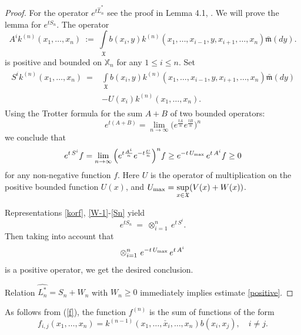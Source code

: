 \documentclass[a4paper,12pt]{article}
\newcommand{\XX}{{\mathbb X}}
\newcommand{\XXX}{{\mathfrak{X}}}
\begin{document}
\begin{proof}
For the operator $e^{t \hat L_n^{\ast}}$ see the proof in Lemma 4.1, \cite{PZ-PPI}. We will prove the lemma for $e^{t S_n}$.
The operator
$$
A^i k^{(n)}(x_1, \ldots, x_n) \ := \ \int\limits_{\XXX} b(x_i, y) k^{(n)} (x_1, \ldots, x_{i-1}, y,
x_{i+1}, \ldots, x_n) \bar{\mathfrak{m}}(dy).
$$
is positive and bounded on $\XX_{n}$ for any $1\leq i\leq n$.
Set
\begin{align}
\begin{aligned}\label{21}
S^i k^{(n)}(x_1, \ldots, x_n) \ = &\int\limits_{\XXX} b(x_i, y) k^{(n)}(x_1, \ldots, x_{i-1}, y, x_{i+1}, \ldots,
x_n) \bar{\mathfrak{m}}( dy)\\
& - U(x_i) k^{(n)}(x_1, \ldots, x_n).
\end{aligned}
\end{align}
Using the Trotter formula for the sum $A+B$ of two bounded operators:
$$
e^{t(A+B)} = \lim\limits_{n \to \infty} \Big( e^{\frac{t A}{n}} e^{\frac{t B}{n}} \Big)^n
$$
we conclude that
\begin{equation}\label{20L}
e^{t \, S^{i} }f = \lim\limits_{n \to \infty} \Big( e^{t \frac{ A^{i}}{n}} e^{-t \frac{U}{n}} \Big)^n f \ge  e^{- t \, U_{\rm{max}}} \, e^{t \, A^{i}} f \ge 0
\end{equation}
for any non-negative function $f$. Here $U$ is the operator of multiplication on the positive bounded function $U(x)$, and $ U_{\rm{max}} = \sup\limits_{x \in \XXX}(V(x)+W(x))$.

Representations \eqref{korf}, \eqref{W-1}-\eqref{Sn} yield
$$
e^{t S_n} \ = \ \otimes_{i=1}^n \  e^{t \, S^{i}}.
$$
Then taking into account that
\begin{equation}\label{20L}
\otimes_{i=1}^n \ e^{- t \, U_{\rm{max}}} \, e^{t \, A^{i}}
\end{equation}
is a positive operator, we get the desired conclusion.

Relation $\hat {L_n^{\ast}} = S_n + W_n$ with $W_n \ge 0$ immediately implies estimate \eqref{positive}.
\end{proof}



As follows from (\ref{f}), the function $f^{(n)}$ is the sum of
functions of the form
\begin{equation}\label{32}
f_{i,j} (x_1, \ldots, x_n)  =  k^{(n-1)} (x_1,\ldots,\check{x_i},
\ldots, x_n)  b(x_i, x_j), \quad i\neq j.
\end{equation}
\end{document}
